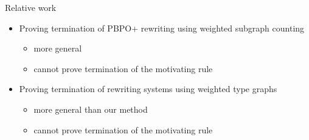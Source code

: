 \documentclass{beamer}
\begin{document}
\begin{frame}{Relative work}
    \begin{itemize}
    \item Proving termination of PBPO+ rewriting using weighted subgraph counting~\cite{overbeek2024termination_lmcs} 
      \begin{itemize}
        \item more general
        \item cannot prove termination of the motivating rule
      \end{itemize}
        \item Proving termination of rewriting systems using weighted type graphs
        ~\cite{zantema2014termination,bruggink2014termination,bruggink2015proving,endrullis2024generalized_arxiv_v2,qiu2025termination_nwf_v2_acceptedgcm}
            \begin{itemize}
                \item more general than our method
                \item cannot prove termination of the motivating rule
             \end{itemize} 

\end{itemize}
\end{frame}
\end{document}
